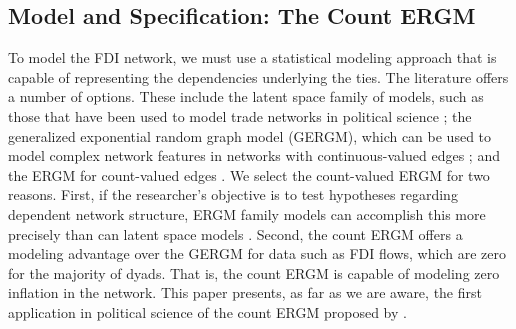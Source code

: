 \documentclass[reqno,onecolumn,letterpaper,12pt]{article}
\begin{document}






\subsection{Model and Specification: The Count ERGM}

To model the FDI network, we must use a statistical modeling approach that is capable of representing the dependencies underlying the ties. The literature offers a number of options. These include the latent space family of models, such as those that have been used to model trade networks in political science \citep{ward2007persistent,ward2013gravity}; the generalized exponential random graph model (GERGM), which can be used to model complex network features in networks with continuous-valued edges \citep{desmarais2012statistical,wilson2017stochastic}; and the ERGM for count-valued edges \citep{krivitsky2012exponential}. We select the count-valued ERGM for two reasons. First, if the researcher's objective is to test hypotheses regarding dependent network structure, ERGM family models can accomplish this more precisely than can latent space models \citep{cranmer2016navigating,cranmer2016critique,desmarais2017statistical}. Second, the count ERGM offers a modeling advantage over the GERGM for data such as FDI flows, which are zero for the majority of dyads. That is, the count ERGM is capable of modeling zero inflation in the network. This paper presents, as far as we are aware, the first application in political science of the count ERGM proposed by \cite{krivitsky2012exponential}.
\end{document}
